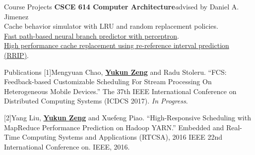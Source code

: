 \documentclass{resume} %
\newcommand{\tab}[1]{\hspace{.2667\textwidth}\rlap{#1}}
\newcommand{\itab}[1]{\hspace{0em}\rlap{#1}}
\begin{document}


\begin{rSection}{Course Projects}
{\bf CSCE 614 Computer Architecture}\hfill {\emph advised by Daniel A. Jimenez}\\
Cache behavior simulator with LRU and random replacement policies.\\
\href{https://github.com/vincenttsang/CompArch/blob/master/branch-predictor/p1-final-report/p1-final-report.pdf}{Fast path-based neural branch predictor with perceptron}.\\
\href{https://github.com/vincenttsang/CompArch/blob/master/cache-replacer/p2-final-report/p2-final-report.pdf}{High performance cache replacement using re-reference interval prediction (RRIP)}.
\end{rSection}

\begin{rSection}{Publications}
{[1]Mengyuan Chao, }\underline{\bf Yukun Zeng}{ and Radu Stoleru. ``FCS: Feedback-based Customizable Scheduling For Stream Processing On Heterogeneous Mobile Devices.'' The 37th IEEE International Conference on Distributed Computing Systems (ICDCS 2017). \emph{In Progress}.
}
\vspace*{-0.2em}

{[2]Yang Liu, }\underline{\bf Yukun Zeng}{ and Xuefeng Piao. ``High-Responsive Scheduling with MapReduce Performance Prediction on Hadoop YARN.'' Embedded and Real-Time Computing Systems and Applications (RTCSA), 2016 IEEE 22nd International Conference on. IEEE, 2016.
}

\end{rSection}
\end{document}
